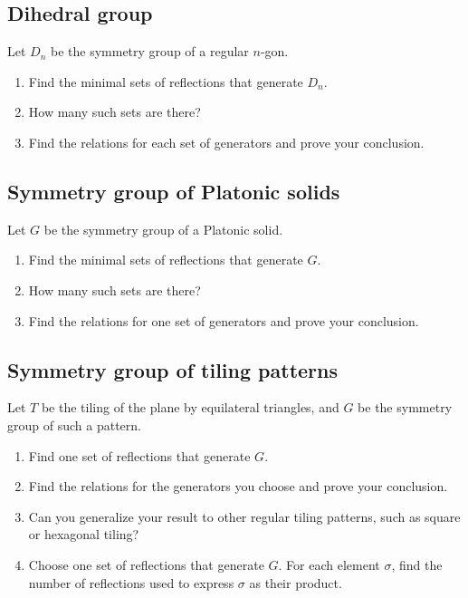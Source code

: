 \documentclass[12pt]{article}
\theoremstyle{definition}
\theoremstyle{remark}
\begin{document}
\subsection{Dihedral group}
Let $D_n$ be the symmetry group of a regular $n$-gon. 
\begin{enumerate}
    \item Find the minimal sets of reflections that generate $D_n$.
    \item How many such sets are there?
    \item Find the relations for each set of generators and prove your conclusion.
\end{enumerate}

\subsection{Symmetry group of Platonic solids}
Let $G$ be the symmetry group of a Platonic solid.
\begin{enumerate}
    \item Find the minimal sets of reflections that generate $G$.
    \item How many such sets are there?
    \item Find the relations for one set of generators and prove your conclusion.
\end{enumerate}

\subsection{Symmetry group of tiling patterns}
Let $T$ be the tiling of the plane by equilateral triangles, and $G$ be the symmetry group of such a pattern.
\begin{enumerate}
    \item Find one set of reflections that generate $G$.
    \item Find the relations for the generators you choose and prove your conclusion.
    \item Can you generalize your result to other regular tiling patterns, such as square or hexagonal tiling?
    \item Choose one set of reflections that generate $G$. For each element $\sigma$, find the number of reflections used to express $\sigma$ as their product.
\end{enumerate}
\end{document}
